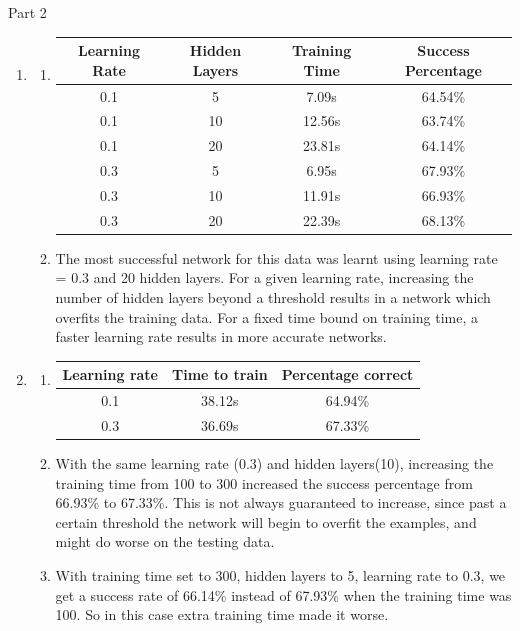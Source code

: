\documentclass[11pt]{article}
\begin{document}
Part 2
\begin{enumerate}
	\item
		\begin{enumerate}
			\item
			\begin{tabular}{|c|c|c|c|}
				\hline
					Learning Rate & Hidden Layers & Training Time & Success Percentage \\
				\hline
					0.1 &  5	&	7.09s & 64.54\%\\
					0.1 & 10	&	12.56s& 63.74\%\\
					0.1 & 20	&	23.81s& 64.14\%\\
					0.3 &  5	&	6.95s & 67.93\%\\
					0.3 & 10	&	11.91s& 66.93\%\\
					0.3 & 20	&	22.39s& 68.13\%\\
				\hline       
			\end{tabular}
			
			\item The most successful network for this data was learnt using
			 learning rate = 0.3 and 20 hidden layers.	For a given learning rate, increasing
			 the number of hidden layers beyond a threshold  results in 
			 a network which overfits the training data. For a fixed time bound on
			 training time, a faster learning rate results in more accurate networks.
		\end{enumerate}
		
		\item
			\begin{enumerate}
				\item
					\begin{tabular}{|c|c|c|}
					\hline
						Learning rate & Time to train & Percentage correct \\
					\hline
						0.1 & 38.12s & 64.94\% \\
						0.3 & 36.69s & 67.33\% \\
					\hline
					\end{tabular}
					
				\item With the same learning rate (0.3) and hidden layers(10), increasing the
				training time from 100 to 300 increased the success percentage from 66.93\% to
				67.33\%. This is not always guaranteed to increase, since past a certain
				threshold the network will begin to overfit the examples, and might do worse
				on the testing data.
				
				\item With training time set to 300, hidden layers to 5, learning rate to 0.3,
				we get a success rate of 66.14\% instead of 67.93\% when the training time
				was 100. So in this case extra training time made it worse.
			\end{enumerate}
			

\end{enumerate}
\end{document}
